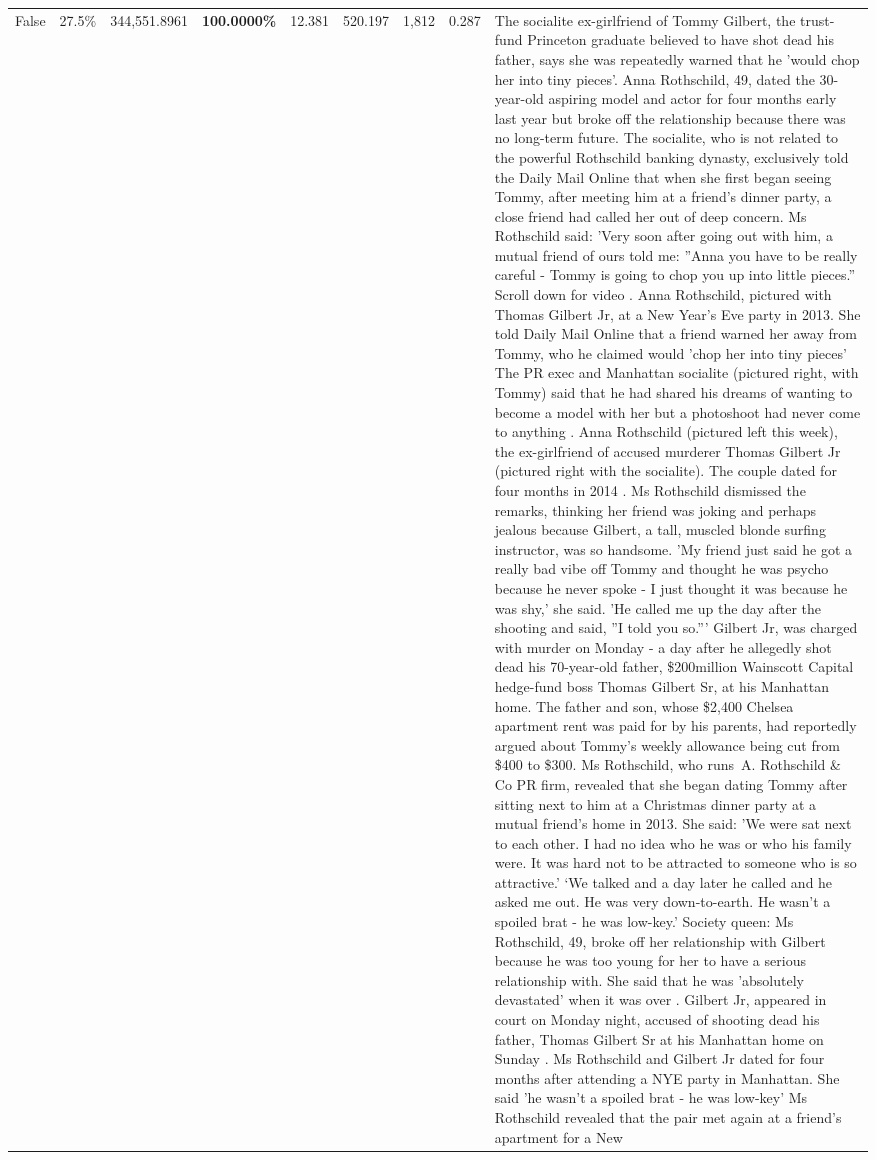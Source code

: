 \begin{table}[H]
\begin{tabular}{lllrlllll}
False & 27.5\% & 344,551.8961 & \bfseries \color{red} 100.0000\% & 12.381 & 520.197 & 1,812 & 0.287 & The socialite ex-girlfriend of Tommy Gilbert, the trust-fund Princeton graduate believed to have shot dead his father, says she was repeatedly warned that he 'would chop her into tiny pieces'. Anna Rothschild, 49, dated the 30-year-old aspiring model and actor for four months early last year but broke off the relationship because there was no long-term future. The socialite, who is not related to the powerful Rothschild banking dynasty, exclusively told the Daily Mail Online that when she first began seeing Tommy, after meeting him at a friend's dinner party, a close friend had called her out of deep concern. Ms Rothschild said: 'Very soon after going out with him, a mutual friend of ours told me: ''Anna you have to be really careful - Tommy is going to chop you up into little pieces.'' Scroll down for video . Anna Rothschild, pictured with Thomas Gilbert Jr, at a New Year's Eve party in 2013. She told Daily Mail Online that a friend warned her away from Tommy, who he claimed would 'chop her into tiny pieces' The PR exec and Manhattan socialite (pictured right, with Tommy) said that he had shared his dreams of wanting to become a model with her but a photoshoot had never come to anything . Anna Rothschild (pictured left this week), the ex-girlfriend of accused murderer Thomas Gilbert Jr (pictured right with the socialite). The couple dated for four months in 2014 . Ms Rothschild dismissed the remarks, thinking her friend was joking and perhaps jealous because Gilbert, a tall, muscled blonde surfing instructor, was so handsome. 'My friend just said he got a really bad vibe off Tommy and thought he was psycho because he never spoke - I just thought it was because he was shy,' she said. 'He called me up the day after the shooting and said, ''I told you so.''' Gilbert Jr, was charged with murder on Monday - a day after he allegedly shot dead his 70-year-old father, \$200million Wainscott Capital hedge-fund boss Thomas Gilbert Sr, at his Manhattan home. The father and son, whose \$2,400 Chelsea apartment rent was paid for by his parents, had reportedly argued about Tommy's weekly allowance being cut from \$400 to \$300. Ms Rothschild, who runs A. Rothschild \& Co PR firm, revealed that she began dating Tommy after sitting next to him at a Christmas dinner party at a mutual friend's home in 2013. She said: 'We were sat next to each other. I had no idea who he was or who his family were. It was hard not to be attracted to someone who is so attractive.' ‘We talked and a day later he called and he asked me out. He was very down-to-earth. He wasn’t a spoiled brat - he was low-key.’ Society queen: Ms Rothschild, 49, broke off her relationship with Gilbert because he was too young for her to have a serious relationship with. She said that he was 'absolutely devastated' when it was over . Gilbert Jr, appeared in court on Monday night, accused of shooting dead his father, Thomas Gilbert Sr at his Manhattan home on Sunday . Ms Rothschild and Gilbert Jr dated for four months after attending a NYE party in Manhattan. She said 'he wasn't a spoiled brat - he was low-key' Ms Rothschild revealed that the pair met again at a friend’s apartment for a New 
\end{tabular}
\end{table}
